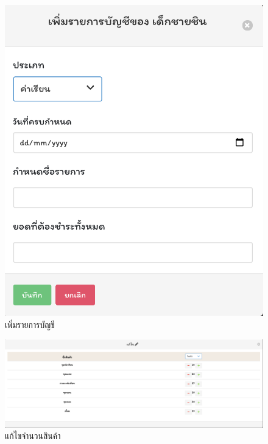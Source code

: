 \begin{figure}
    \begin{center}
      \includegraphics[width=\linewidth]{images/CreatePayment.png}
    \end{center}
    \caption[Poem]{เพิ่มรายการบัญชี}
    \label{fig:CreatePay}
\end{figure}

\begin{figure}
    \begin{center}
      \includegraphics[width=\linewidth]{images/handleStock.png}
    \end{center}
    \caption[Poem]{แก้ไขจำนวนสินค้า}
    \label{fig:handlestock}
\end{figure}

